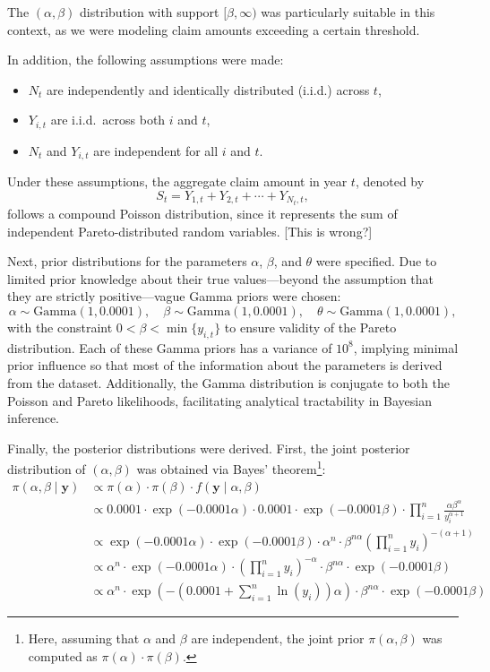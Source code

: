 \documentclass{Class/julia}
\begin{document}
\noindent The \((\alpha, \beta)\) distribution with support \( [\beta, \infty) \) was particularly suitable in this context, as we were modeling claim amounts exceeding a certain threshold.

In addition, the following assumptions were made:

\begin{itemize}
\item \( N_t \) are independently and identically distributed (i.i.d.) across \( t \),
\item \( Y_{i,t} \) are i.i.d.\ across both \( i \) and \( t \),
\item \( N_t \) and \( Y_{i,t} \) are independent for all \( i \) and \( t \).
\end{itemize}

\noindent Under these assumptions, the aggregate claim amount in year \( t \), denoted by
\[
S_t = Y_{1,t} + Y_{2,t} + \cdots + Y_{N_t,t},
\]
follows a compound Poisson distribution, since it represents the sum of independent Pareto-distributed random variables. [This is wrong?]

Next, prior distributions for the parameters \( \alpha \), \( \beta \), and \( \theta \) were specified. Due to limited prior knowledge about their true values—beyond the assumption that they are strictly positive—vague Gamma priors were chosen:
\[
\alpha \sim \text{Gamma}(1, 0.0001), \quad \beta \sim \text{Gamma}(1, 0.0001), \quad \theta \sim \text{Gamma}(1, 0.0001),
\]
with the constraint \( 0 < \beta < \min\{y_{i,t}\} \) to ensure validity of the Pareto distribution. Each of these Gamma priors has a variance of \(10^8\), implying minimal prior influence so that most of the information about the parameters is derived from the dataset. Additionally, the Gamma distribution is conjugate to both the Poisson and Pareto likelihoods, facilitating analytical tractability in Bayesian inference.

Finally, the posterior distributions were derived. First, the joint posterior distribution of \( (\alpha, \beta) \) was obtained via Bayes' theorem\footnote{Here, assuming that \( \alpha \) and \( \beta \) are independent, the joint prior \( \pi(\alpha, \beta) \) was computed as \( \pi(\alpha) \cdot \pi(\beta) \).}:
\begin{align*}
\pi(\alpha, \beta \mid \mathbf{y}) &\propto \pi(\alpha) \cdot \pi(\beta) \cdot f(\mathbf{y} \mid \alpha, \beta) \\
&\propto 0.0001 \cdot \exp(-0.0001 \alpha) \cdot 0.0001 \cdot \exp(-0.0001 \beta) \cdot \prod_{i=1}^{n} \frac{\alpha \beta^\alpha}{y_i^{\alpha+1}} \\
&\propto \exp(-0.0001 \alpha) \cdot \exp(-0.0001 \beta) \cdot \alpha^n \cdot \beta^{n \alpha} \left( \prod_{i=1}^{n} y_i \right)^{-(\alpha + 1)} \\
&\propto \alpha^n \cdot \exp(-0.0001 \alpha) \cdot \left( \prod_{i=1}^{n} y_i \right)^{-\alpha} \cdot \beta^{n \alpha} \cdot \exp(-0.0001 \beta) \\
&\propto \alpha^n \cdot \exp\left( - \left( 0.0001 + \sum_{i=1}^{n} \ln(y_i) \right) \alpha \right) \cdot \beta^{n \alpha} \cdot \exp(-0.0001 \beta)
\end{align*}
\end{document}
